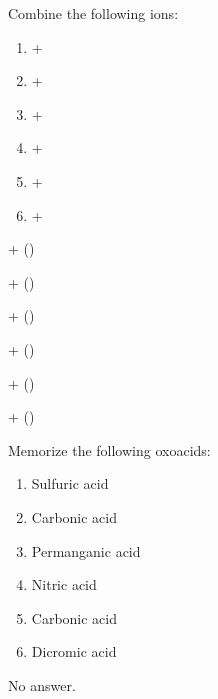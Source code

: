 \documentclass[main.tex]{subfiles}
\begin{document}
\begin{multicols*}{2}
\begin{question}[ID=\the\value{numA}]
Combine the following ions:
\begin{multicols}{2}
  \noindent
  \begin{enumerate} [topsep=0pt, partopsep=1pt, label=(\alph*), leftmargin=.5cm]
\item {} +    %
\item {} +   %
\item {} +   %
\item   {} +   %
\item  {} +   %
\item   {} +   %
\end{enumerate}
\end{multicols}    
\end{question}
\begin{solution}
\begin{inparaenum}[(a)]
\item {} +     ()
\item {} +    ()
\item {} +    ()
\item   {} +    ()
\item   {} +    ()
\item  {} +    ()
\end{inparaenum}\hspace{0.1cm}\end{solution}

\begin{question}[ID=\the\value{numA}]
Memorize the following oxoacids:
  \noindent
  \begin{enumerate} [topsep=0pt, partopsep=1pt, label=(\alph*), leftmargin=.5cm]
\item {} Sulfuric acid
\item {} Carbonic acid
\item {} Permanganic acid
\item {} Nitric acid
\item {} Carbonic acid
\item {} Dicromic acid
\end{enumerate}
\end{question}
\begin{solution}
No answer.\hspace{0.1cm}\end{solution}


\end{multicols*}
\end{document}
